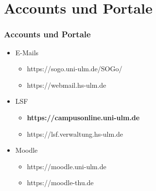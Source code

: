 \documentclass[10pt,a4paper]{beamer}
\begin{document}
    \section{Accounts und Portale}
    \begin{frame}
        \frametitle{Accounts und Portale}
        \begin{itemize}
            \setlength{\itemsep}{10pt} %
            \item E-Mails
            \begin{itemize}
                \setlength{\itemsep}{10pt} %
                \item https://sogo.uni-ulm.de/SOGo/
                \item https://webmail.hs-ulm.de
            \end{itemize}
            \item LSF
            \begin{itemize}
                \setlength{\itemsep}{10pt} %
                \item \textbf{https://campusonline.uni-ulm.de}
                \item https://lsf.verwaltung.hs-ulm.de
            \end{itemize}
            \item Moodle
            \begin{itemize}
                \setlength{\itemsep}{10pt} %
                \item https://moodle.uni-ulm.de
                \item https://moodle-thu.de
            \end{itemize}
        \end{itemize}
    \end{frame}
\end{document}

